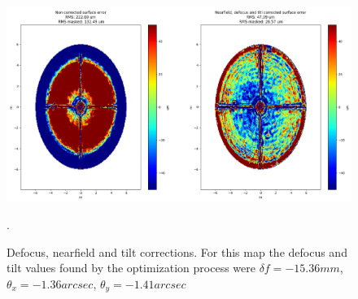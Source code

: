 \begin{figure}
    \centering
    \includegraphics[width=1\textwidth]{images/nearfield_correction.png}
    \caption{Defocus, nearfield and tilt corrections. For this map the defocus and tilt values found by the optimization process were $\delta f = -15.36mm$, $\theta_x=-1.36arcsec$, $\theta_y =-1.41arcsec$}.
    \label{fig:nearfield_correction}
\end{figure}







